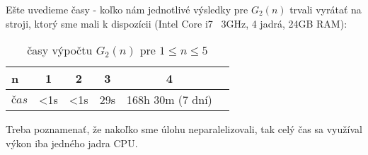 Ešte uvedieme časy - koľko nám jednotlivé výsledky pre $G_2(n)$ trvali vyrátať na stroji, ktorý sme mali k dispozícii (Intel Core i7 ~3GHz, 4 jadrá, 24GB RAM):

\begin{table}[H]
  \centering
  \begin{tabular}{|l|c|c|c|c|r|}
    \hline
    n & 1 & 2 & 3 & 4 \\ 
    \hline
    $čas$ & <1s & <1s & 29s & 168h 30m (7 dní) \\ 
    \hline
  \end{tabular}
  \caption{časy výpočtu $G_2(n)$ pre $1 \leq n \leq 5$}
  \label{tab:G1n}
\end{table}

Treba poznamenať, že nakoľko sme úlohu neparalelizovali, tak celý čas sa využíval výkon iba jedného jadra CPU.